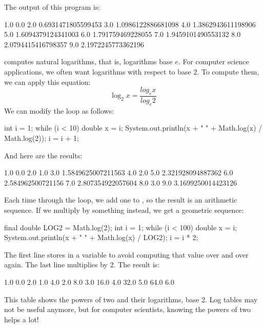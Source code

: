 The output of this program is:

\begin{stdout}
1.0   0.0
2.0   0.6931471805599453
3.0   1.0986122886681098
4.0   1.3862943611198906
5.0   1.6094379124341003
6.0   1.791759469228055
7.0   1.9459101490553132
8.0   2.0794415416798357
9.0   2.1972245773362196
\end{stdout}

 computes natural logarithms, that is, logarithms base $e$.
For computer science applications, we often want logarithms with respect to base 2.
To compute them, we can apply this equation:
%
\[ \log_2 x = \frac{log_e x}{log_e 2} \]
%
We can modify the loop as follows:

\begin{code}
int i = 1;
while (i < 10) {
    double x = i;
    System.out.println(x + "   " + Math.log(x) / Math.log(2));
    i = i + 1;
}
\end{code}

And here are the results:

\begin{stdout}
1.0   0.0
2.0   1.0
3.0   1.5849625007211563
4.0   2.0
5.0   2.321928094887362
6.0   2.584962500721156
7.0   2.807354922057604
8.0   3.0
9.0   3.1699250014423126
\end{stdout}

Each time through the loop, we add one to , so the result is an arithmetic sequence.
If we multiply  by something instead, we get a geometric sequence:

\begin{code}
final double LOG2 = Math.log(2);
int i = 1;
while (i < 100) {
    double x = i;
    System.out.println(x + "   " + Math.log(x) / LOG2);
    i = i * 2;
}
\end{code}


The first line stores  in a  variable to avoid computing that value over and over again.
The last line multiplies  by 2.
The result is:

\begin{stdout}
1.0   0.0
2.0   1.0
4.0   2.0
8.0   3.0
16.0   4.0
32.0   5.0
64.0   6.0
\end{stdout}

This table shows the powers of two and their logarithms, base 2.
Log tables may not be useful anymore, but for computer scientists, knowing the powers of two helps a lot!


